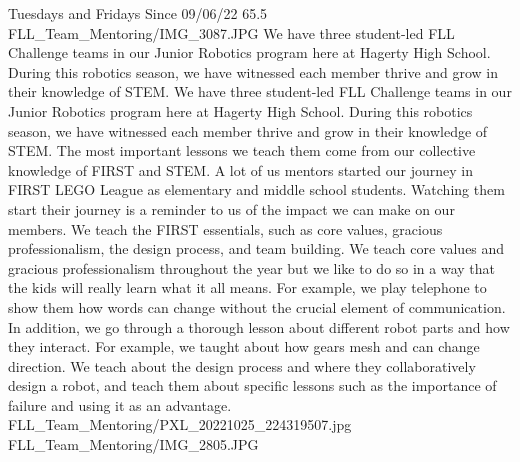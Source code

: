 {Tuesdays and Fridays Since 09/06/22}
{65.5}
{FLL_Team_Mentoring/IMG_3087.JPG}
{We have three student-led FLL Challenge teams in our Junior Robotics program here at Hagerty High School. During this robotics season, we have witnessed each member thrive and grow in their knowledge of STEM.}
{We have three student-led FLL Challenge teams in our Junior Robotics program here at Hagerty High School. During this robotics season, we have witnessed each member thrive and grow in their knowledge of STEM. The most important lessons we teach them come from our collective knowledge of FIRST and STEM. A lot of us mentors started our journey in FIRST LEGO League as elementary and middle school students. Watching them start their journey is a reminder to us of the impact we can make on our members. We teach the FIRST essentials, such as core values, gracious professionalism, the design process, and team building. We teach core values and gracious professionalism throughout the year but we like to do so in a way that the kids will really learn what it all means. For example, we play telephone to show them how words can change without the crucial element of communication. In addition, we go through a thorough lesson about different robot parts and how they interact. For example, we taught about how gears mesh and can change direction. We teach about the design process and where they collaboratively design a robot, and teach them about specific lessons such as the importance of failure and using it as an advantage.  
} 
{FLL_Team_Mentoring/PXL_20221025_224319507.jpg}
{FLL_Team_Mentoring/IMG_2805.JPG}
